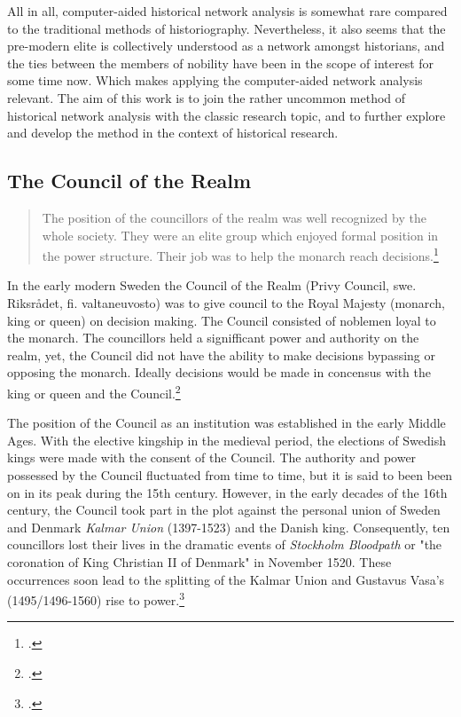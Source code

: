 All in all, computer-aided historical network analysis is somewhat rare compared to the traditional methods of historiography. Nevertheless, it also seems that the pre-modern elite is collectively understood as a network amongst historians, and the ties between the members of nobility have been in the scope of interest for some time now. Which makes applying the computer-aided network analysis relevant. The aim of this work is to join the rather uncommon method of historical network analysis with the classic research topic, and to further explore and develop the method in the context of historical research.

\subsection{The Council of the Realm}
\begin{quote}
	The position of the councillors of the realm was well recognized by the whole society. They were an elite group which enjoyed formal position in the power structure. Their job was to help the monarch reach decisions.\footcite[p. 26.]{agencyAndStateBuilding}
\end{quote}

In the early modern Sweden the Council of the Realm (Privy Council, swe. Riksrådet, fi. valtaneuvosto) was to give council to the Royal Majesty (monarch, king or queen) on decision making. The Council consisted of noblemen loyal to the monarch. The councillors held a signifficant power and authority on the realm, yet, the Council did not have the ability to make decisions bypassing or opposing the monarch. Ideally decisions would be made in concensus with the king or queen and the Council.\footcites[p. 13-14,]{hopesAndFearsIntro}[p. 47-50.]{HakanenAKoskinen2017}

The position of the Council as an institution was established in the early Middle Ages. With the elective kingship in the medieval period, the elections of Swedish kings were made with the consent of the Council. The authority and power possessed by the Council fluctuated from time to time, but it is said to been been on in its peak during the 15th century. However, in the early decades of the 16th century, the Council took part in the plot against the personal union of Sweden and Denmark \textit{Kalmar Union} (1397-1523) and the Danish king. Consequently, ten councillors lost their lives in the dramatic events of \textit{Stockholm Bloodpath} or "the coronation of King Christian II of Denmark" in November 1520. These occurrences soon lead to the splitting of the Kalmar Union and Gustavus Vasa's (1495/1496-1560) rise to power.\footcites[p. 49-50,]{HakanenAKoskinen2017}[p. 8-9.]{personalAgency}


